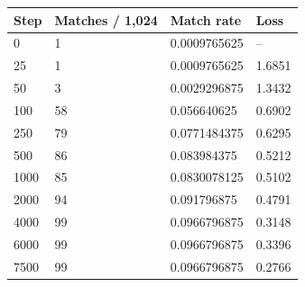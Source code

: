 \begin{tabular}{llll}
\toprule
Step & Matches / 1,024 & Match rate & Loss \\
\midrule
0 & 1 & 0.0009765625 & -- \\
25 & 1 & 0.0009765625 & 1.6851 \\
50 & 3 & 0.0029296875 & 1.3432 \\
100 & 58 & 0.056640625 & 0.6902 \\
250 & 79 & 0.0771484375 & 0.6295 \\
500 & 86 & 0.083984375 & 0.5212 \\
1000 & 85 & 0.0830078125 & 0.5102 \\
2000 & 94 & 0.091796875 & 0.4791 \\
4000 & 99 & 0.0966796875 & 0.3148 \\
6000 & 99 & 0.0966796875 & 0.3396 \\
7500 & 99 & 0.0966796875 & 0.2766 \\
\bottomrule
\end{tabular}
